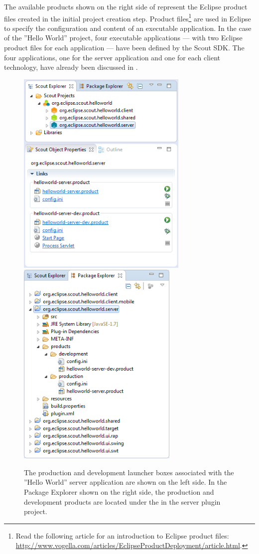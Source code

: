 \documentclass[a4paper,10pt,twoside]{book}
\begin{document}
The available products shown on the right side of  represent the Eclipse product files created in the initial project creation step.
Product files\footnote{
Read the following article for an introduction to Eclipse product files: \url{http://www.vogella.com/articles/EclipseProductDeployment/article.html}.
}
are used in Eclipse to specify the configuration and content of an executable application.
In the case of the ''Hello World'' project, four executable applications --- with two Eclipse product files for each application --- have been defined by the Scout SDK.
The four applications, one for the server application and one for each client technology, have already been discussed in .

\begin{figure}
\includegraphics[height=10cm]{sdk_server_node_properties.png} \hspace{0.5cm}
\includegraphics[height=10cm]{sdk_server_plugin_explorer.png}
\caption{The production and development launcher boxes associated with the ''Hello World'' server application are shown on the left side. 
In the Package Explorer shown on the right side, the production and development products are located under the  in the server plugin project.
}
\end{figure}
\end{document}
